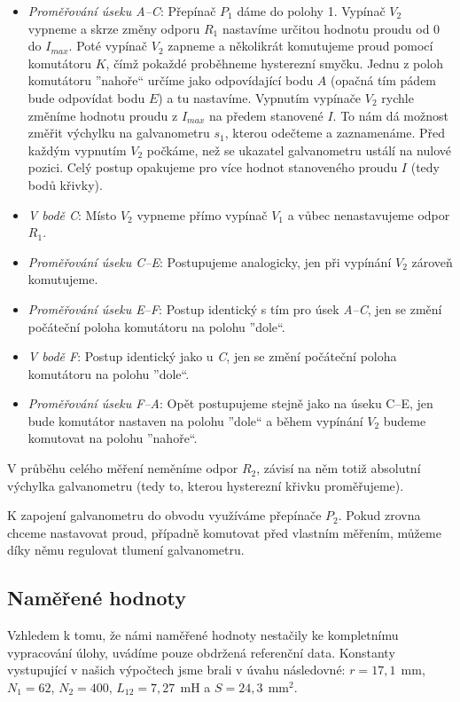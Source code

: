 \documentclass[english]{article}
\newcommand{\unit}[1]{\ \mathrm{#1}}
\begin{document}
		\begin{itemize}
			\item \emph{Proměřování úseku A--C}: Přepínač $P_1$ dáme do polohy 1. Vypínač  $V_2$ vypneme a skrze změny odporu $R_1$ nastavíme určitou hodnotu proudu od 0 do $I_{max}$. Poté vypínač $V_2$ zapneme a několikrát komutujeme proud pomocí komutátoru $K$, čímž pokaždé proběhneme hysterezní smyčku. Jednu z poloh komutátoru ''nahoře`` určíme jako odpovídající bodu $A$ (opačná tím pádem bude odpovídat bodu $E$) a tu nastavíme. Vypnutím vypínače $V_2$ rychle změníme hodnotu proudu z $I_{max}$ na předem stanovené $I$. To nám dá možnost změřit výchylku na galvanometru $s_1$, kterou odečteme a zaznamenáme. Před každým vypnutím $V_2$ počkáme, než se ukazatel galvanometru ustálí na nulové pozici. Celý postup opakujeme pro více hodnot stanoveného proudu $I$ (tedy bodů křivky). 
		
			\item \emph{V bodě C}: Místo $V_2$ vypneme přímo vypínač $V_1$ a vůbec nenastavujeme odpor $R_1$. 
		
			\item \emph{Proměřování úseku C--E}: Postupujeme analogicky, jen při vypínání $V_2$ zároveň komutujeme.
		
			\item \emph{Proměřování úseku E--F}: Postup identický s tím pro úsek \emph{A--C}, jen se změní počáteční poloha komutátoru na polohu ''dole``.
		
			\item \emph{V bodě F}: Postup identický jako u \emph{C}, jen se změní počáteční poloha komutátoru na polohu ''dole``.
		
			\item \emph{Proměřování úseku F--A}: Opět postupujeme stejně jako na úseku C--E, jen bude komutátor nastaven na polohu ''dole`` a během vypínání $V_2$ budeme komutovat na polohu ''nahoře``.
		\end{itemize}
		
		V průběhu celého měření neměníme odpor $R_2$, závisí na něm totiž absolutní výchylka galvanometru (tedy to, kterou hysterezní křivku proměřujeme).
		
		K zapojení galvanometru do obvodu využíváme přepínače $P_2$. Pokud zrovna chceme nastavovat proud, případně komutovat před vlastním měřením, můžeme díky němu regulovat tlumení galvanometru.		
				
		\subsection{Naměřené hodnoty}
			Vzhledem k tomu, že námi naměřené hodnoty nestačily ke kompletnímu vypracování úlohy, uvádíme pouze obdržená referenční data. Konstanty vystupující v našich výpočtech jsme brali v úvahu následovné: $r=17,1~\unit{mm}$, $N_1=62$, $N_2=400$, $L_{12}=7,27~\unit{mH}$ a $S=24,3~\unit{mm^2}$.
			
\end{document}
